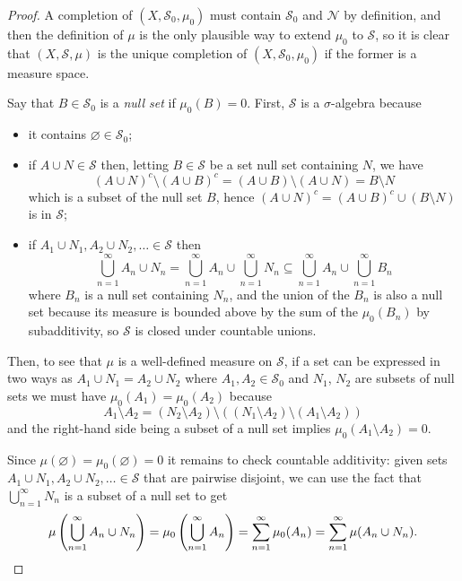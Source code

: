 \documentclass[11pt]{scrartcl}
\providecommand{\ii}{\item}
\begin{document}
\begin{proof}
    A completion of $(X,\mathcal S_0,\mu_0)$ must contain
    $\mathcal S_0$ and $\mathcal N$ by definition,
    and then the definition of $\mu$ is the only plausible way
    to extend $\mu_0$ to $\mathcal S$,
    so it is clear that $(X,\mathcal S, \mu)$ is the unique completion
    of $(X,\mathcal S_0,\mu_0)$ if the former is a measure space.

    Say that $B\in\mathcal S_0$ is a \emph{null set} if $\mu_0(B) = 0$.
    First, $\mathcal S$ is a $\sigma$-algebra because
    \begin{itemize}
        \ii it contains $\varnothing\in\mathcal S_0$;
	\ii if $A\cup N\in\mathcal S$ then, letting $B\in\mathcal S$
	be a set null set containing $N$, we have
	\begin{equation*}
	    (A\cup N)^c\setminus(A\cup B)^c
	    = (A\cup B)\setminus (A\cup N)
	    = B\setminus N
	\end{equation*}
	which is a subset of the null set $B$, hence
	$(A\cup N)^c = (A\cup B)^c \cup (B\setminus N)$
	is in $\mathcal S$;
	\ii if $A_1\cup N_1, A_2\cup N_2,\ldots\in\mathcal S$ then
	\begin{equation*}
	    \bigcup_{n=1}^\infty A_n\cup N_n =
	    \bigcup_{n=1}^\infty A_n\cup\bigcup_{n=1}^\infty N_n
	    \subseteq \bigcup_{n=1}^\infty A_n\cup\bigcup_{n=1}^\infty B_n
	\end{equation*}
	where $B_n$ is a null set containing $N_n$,
	and the union of the $B_n$ is also a null set because
	its measure is bounded above by the sum of the $\mu_0(B_n)$
	by subadditivity, so $\mathcal S$ is closed under
	countable unions.
    \end{itemize}
    Then, to see that $\mu$ is a well-defined measure on $\mathcal S$,
    if a set can be expressed in two ways as $A_1\cup N_1 = A_2\cup N_2$
    where $A_1,A_2\in\mathcal S_0$ and $N_1$, $N_2$ are subsets of null sets
    we must have $\mu_0(A_1) = \mu_0(A_2)$ because
    \begin{equation*}
	A_1\setminus A_2
	= (N_2\setminus A_2)\setminus((N_1\setminus A_2)\setminus(A_1\setminus A_2))
    \end{equation*}
    and the right-hand side being a subset of a null set
    implies $\mu_0(A_1\setminus A_2) = 0$.

    Since $\mu(\varnothing) = \mu_0(\varnothing) = 0$
    it remains to check countable additivity:
    given sets $A_1\cup N_1,A_2\cup N_2,\ldots\in\mathcal S$
    that are pairwise disjoint,
    we can use the fact that $\bigcup_{n=1}^\infty N_n$
    is a subset of a null set to get
    \begin{equation*}
	\mu\left(\bigcup_{n=1}^\infty A_n\cup N_n\right)
	= \mu_0\left(\bigcup_{n=1}^\infty A_n\right)
	= \sum_{n=1}^\infty \mu_0(A_n)
	= \sum_{n=1}^\infty \mu(A_n\cup N_n).\qedhere
    \end{equation*}
\end{proof}
\end{document}
